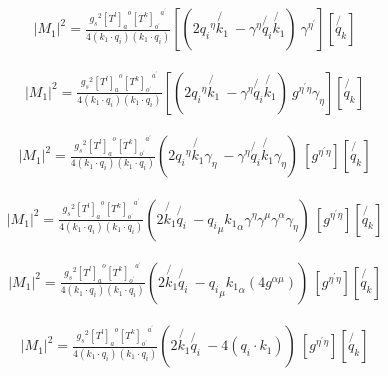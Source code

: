 \begin{equation}
\begin{split}
|M_1|^2=\frac{{g_s}^2 {[T^l]_a}^o {[T^k]_{o^{\prime}}}^{a^{\prime}}}{4(k_1 \cdot q_i)(k_1 \cdot q_i)}[(2{q_i}^{\eta}\not{k_1}\:-{\gamma}^{\eta}\not{q_i}\not{k_1})\: {\gamma}^{{\eta}^{\prime}}][\not{q_k}]
\end{split}
\end{equation}

\begin{equation}
\begin{split}
|M_1|^2=\frac{{g_s}^2 {[T^l]_a}^o {[T^k]_{o^{\prime}}}^{a^{\prime}}}{4(k_1 \cdot q_i)(k_1 \cdot q_i)}[(2{q_i}^{\eta}\not{k_1}\:-{\gamma}^{\eta}\not{q_i}\not{k_1})\: {g}^{{\eta}^{\prime} \eta} \gamma_{\eta}][\not{q_k}]
\end{split}
\end{equation}

\begin{equation}
\begin{split}
|M_1|^2=\frac{{g_s}^2 {[T^l]_a}^o {[T^k]_{o^{\prime}}}^{a^{\prime}}}{4(k_1 \cdot q_i)(k_1 \cdot q_i)}(2{q_i}^{\eta}\not{k_1}\gamma_{\eta}\:-{\gamma}^{\eta}\not{q_i}\not{k_1}\gamma_{\eta})\: [{g}^{{\eta}^{\prime} \eta} ][\not{q_k}]
\end{split}
\end{equation}

\begin{equation}
\begin{split}
|M_1|^2=\frac{{g_s}^2 {[T^l]_a}^o {[T^k]_{o^{\prime}}}^{a^{\prime}}}{4(k_1 \cdot q_i)(k_1 \cdot q_i)}(2\not{k_1}\not{q_i}\:-{q_i}_{\mu} {k_1}_{\alpha}{\gamma}^{\eta}{\gamma}^{\mu}{\gamma}^{\alpha}\gamma_{\eta})\: [{g}^{{\eta}^{\prime} \eta} ][\not{q_k}]
\end{split}
\end{equation}

\begin{equation}
\begin{split}
|M_1|^2=\frac{{g_s}^2 {[T^l]_a}^o {[T^k]_{o^{\prime}}}^{a^{\prime}}}{4(k_1 \cdot q_i)(k_1 \cdot q_i)}(2\not{k_1}\not{q_i}\:-{q_i}_{\mu} {k_1}_{\alpha}(4g^{\alpha \mu}))\: [{g}^{{\eta}^{\prime} \eta} ][\not{q_k}]
\end{split}
\end{equation}

\begin{equation}
\begin{split}
|M_1|^2=\frac{{g_s}^2 {[T^l]_a}^o {[T^k]_{o^{\prime}}}^{a^{\prime}}}{4(k_1 \cdot q_i)(k_1 \cdot q_i)}(2\not{k_1}\not{q_i}\:-4({q_i} \cdot {k_1}))\: [{g}^{{\eta}^{\prime} \eta} ][\not{q_k}]
\end{split}
\end{equation}

